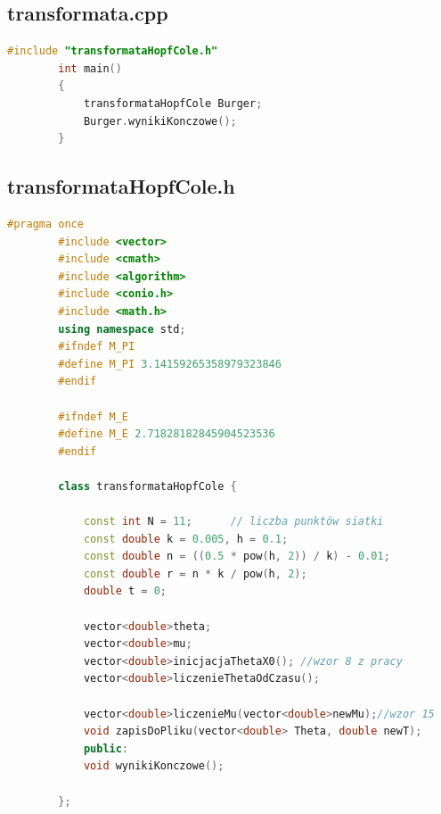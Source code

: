 \documentclass[a4paper,12pt]{article}
\begin{document}
	\subsection{transformata.cpp}
	\begin{lstlisting}[caption={transformata.cpp},label={transformataCalyKod}, language=C++]
		#include "transformataHopfCole.h"
		int main()
		{
			transformataHopfCole Burger;
			Burger.wynikiKonczowe();
		}
	\end{lstlisting}
	\subsection{transformataHopfCole.h}
	\begin{lstlisting}[caption={transformataHopfCole.h},label={transformataHopfCole.hCalyKod}, language=C++]
		#pragma once
		#include <vector>
		#include <cmath>
		#include <algorithm>
		#include <conio.h>
		#include <math.h>
		using namespace std;
		#ifndef M_PI
		#define M_PI 3.14159265358979323846
		#endif
		
		#ifndef M_E
		#define M_E 2.71828182845904523536
		#endif
		
		class transformataHopfCole {
			
			const int N = 11;      // liczba punktów siatki
			const double k = 0.005, h = 0.1;
			const double n = ((0.5 * pow(h, 2)) / k) - 0.01;
			const double r = n * k / pow(h, 2);
			double t = 0;
			
			vector<double>theta;
			vector<double>mu;
			vector<double>inicjacjaThetaX0(); //wzor 8 z pracy
			vector<double>liczenieThetaOdCzasu();
			
			vector<double>liczenieMu(vector<double>newMu);//wzor 15
			void zapisDoPliku(vector<double> Theta, double newT);
			public:
			void wynikiKonczowe();
			
		};
	\end{lstlisting}
\end{document}
